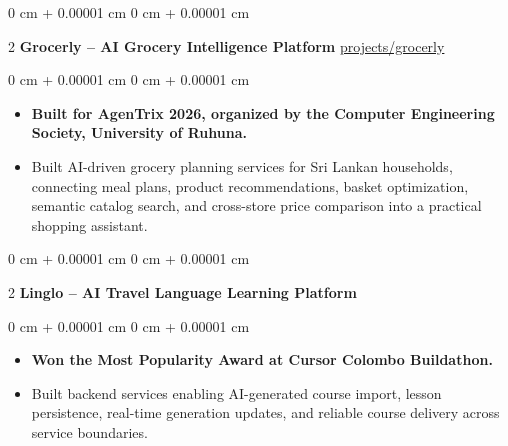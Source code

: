 \documentclass[10pt, letterpaper]{article}
\newenvironment{highlights}{ \begin{itemize}[ topsep=0.10 cm, parsep=0.10 cm, partopsep=0pt,
itemsep=0pt, leftmargin=0 cm + 10pt ] }{ \end{itemize} } %
\newenvironment{onecolentry}{ \begin{adjustwidth}{ 0 cm + 0.00001 cm }{ 0 cm + 0.00001 cm }
}{ \end{adjustwidth} } %
\newenvironment{twocolentry}[2][]{ \onecolentry \def\secondColumn{#2} \setcolumnwidth{\fill, 4.5 cm}
\begin{paracol}{2} }{ \switchcolumn \raggedleft \secondColumn \end{paracol}
\endonecolentry } %
\begin{document}
  \begin{twocolentry}
    {\href{https://suhasdissa.top/projects/grocerly/}{projects/grocerly}} \textbf{Grocerly -- AI Grocery Intelligence Platform}
  \end{twocolentry}
  \vspace{0.10 cm}
  \begin{onecolentry}
    \begin{highlights}
      \item \textbf{Built for AgenTrix 2026, organized by the Computer
      Engineering Society, University of Ruhuna.} \item Built AI-driven grocery planning services for Sri Lankan households,
      connecting meal plans, product recommendations, basket optimization,
      semantic catalog search, and cross-store price comparison into a practical
      shopping assistant.
    \end{highlights}
  \end{onecolentry}

  \vspace{0.5 cm}

  \begin{twocolentry}
    {} \textbf{Linglo -- AI Travel Language Learning Platform}
  \end{twocolentry}
  \vspace{0.10 cm}
  \begin{onecolentry}
    \begin{highlights}
      \item \textbf{Won the Most Popularity Award at Cursor Colombo Buildathon.}
      \item Built backend services enabling AI-generated course import, lesson
      persistence, real-time generation updates, and reliable course delivery
      across service boundaries.
    \end{highlights}
  \end{onecolentry}

  \vspace{0.5 cm}
\end{document}
